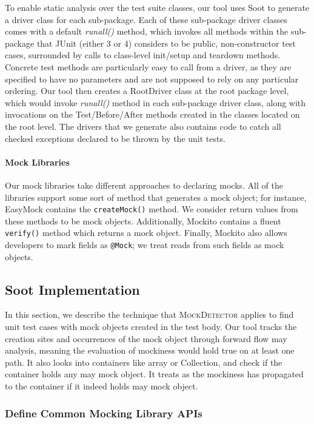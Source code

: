 To enable static analysis over the test suite classes, our tool uses Soot to generate a driver class for each sub-package. Each of these sub-package driver classes comes with a default \textit{runall()} method, which invokes all methods within the sub-package that JUnit (either 3 or 4) considers to be public, non-constructor test cases, surrounded by calls to class-level init/setup and teardown methods. Concrete test methods are particularly easy to call from a driver, as they are specified to have no parameters and are not supposed to rely on any particular ordering. 
Our tool then creates a RootDriver class at the root package level, which would invoke \textit{runall()} method in each sub-package driver class, along with invocations on the Test/Before/After methods created in the classes located on the root level. The drivers that we generate also contains code to catch all checked exceptions declared to be thrown by the unit tests.

\paragraph{Mock Libraries}
Our mock libraries take different approaches to declaring mocks. All of the libraries support some sort of method that generates a mock object; for instance, EasyMock contains the \texttt{createMock()} method. We consider return values from these methods to be mock objects. Additionally, Mockito contains a fluent \texttt{verify()} method which returns a mock object. Finally, Mockito also allows developers to mark fields as \texttt{@Mock}; we treat reads from such fields as mock objects.

\subsection{Soot Implementation}
In this section, we describe the technique that \textsc{MockDetector} applies to find unit test cases with mock objects created in the test body. Our tool tracks the creation sites and occurrences of the mock object through forward flow may analysis, meaning the evaluation of mockiness would hold true on at least one path. It also looks into containers like array or Collection, and check if the container holds any may mock object. It treats as the mockiness has propagated to the container if it indeed holds may mock object.

\subsubsection{Define Common Mocking Library APIs}
\label{subsubsec:collection}

